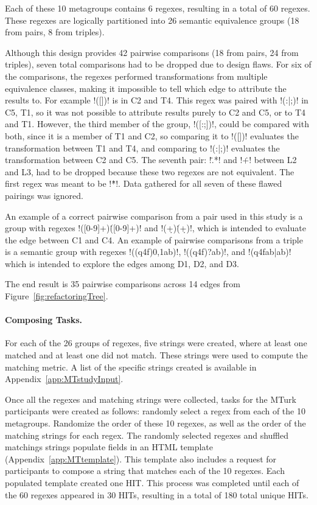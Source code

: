 Each of these 10 metagroups contains 6 regexes, resulting in a total of 60 regexes.  These regexes are logically partitioned into 26 semantic equivalence groups (18 from pairs, 8 from triples).

Although this design provides 42 pairwise comparisons (18 from pairs, 24 from triples),  seven total comparisons had to be dropped due to design flaws.  For six of the comparisons, the regexes performed transformations from multiple equivalence classes, making it impossible to tell which edge to attribute the results to. For example \cverb!([])! is in C2 and T4.  This regex was paired with \cverb!(:|;)! in C5, T1, so it was not possible to attribute results purely to C2 and C5, or to T4 and T1. However, the third member of the group, \cverb!([:;])!, could be compared with both, since it is a member of T1 and C2, so comparing it to \cverb!([])! evaluates the transformation between T1 and T4, and comparing to \cverb!(:|;)! evaluates the transformation between C2 and C5.  The seventh pair: \cverb!\..*! and \cverb!\.+! between L2 and L3, had to be dropped because these two regexes are not equivalent.  The first regex was meant to be \cverb!\.\.*!.  Data gathered for all seven of these flawed pairings was ignored.

An example of a correct pairwise comparison from a pair used in this study is a group with regexes \cverb!([0-9]+)\.([0-9]+)! and  \cverb!(\d+)\.(\d+)!, which is intended to evaluate the edge between C1 and C4.
An example of pairwise comparisons from a triple is a semantic group with regexes \cverb!((q4f){0,1}ab)!, \cverb!((q4f)?ab)!, and \cverb!(q4fab|ab)! which is intended to explore the edges among D1, D2, and D3.

The end result is 35 pairwise comparisons across 14 edges from Figure~\ref{fig:refactoringTree}.

\paragraph{Composing Tasks.}  For each of the 26 groups of regexes, five strings were created, where at least one matched and at least one did not match. These strings were used to compute the matching metric. A list of the specific strings created is available in Appendix~\ref{app:MTstudyInput}.

Once all the regexes and matching strings were collected, tasks for the MTurk participants were created as follows: randomly select a regex from each of the 10 metagroups. Randomize the order of these 10 regexes, as well as the order of the matching strings for each regex. The randomly selected regexes and shuffled matchings strings populate fields in an HTML template (Appendix~\ref{app:MTtemplate}).  This template also includes a request for participants to compose a string that matches each of the 10 regexes.  Each populated template created one HIT.
This process was completed until each of the 60 regexes appeared in 30 HITs, resulting in a total of 180 total unique HITs.

